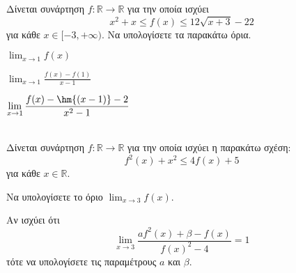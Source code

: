 \documentclass[twoside,nofonts,ektypwsh,math,spyros]{frontisthrio-diag}
\begin{document}
\begin{thema}
Δίνεται συνάρτηση $ f:\mathbb{R}\to\mathbb{R} $ για την οποία ισχύει
\[ x^2+x\leq f(x)\leq 12\sqrt{x+3}-22 \]
για κάθε $ x\in[-3,+\infty) $. Να υπολογίσετε τα παρακάτω όρια.
\begin{multicols}{3}
\begin{erwthma}
\item $ {\displaystyle{\lim_{x\to 1}{f(x)}}} $
\item $ {\displaystyle{\lim_{x\to 1}{\frac{f(x)-f(1)}{x-1}}}} $
\item $ {\displaystyle{\lim_{x\to 1}{\frac{f(x)-\hm{(x-1)}-2}{x^2-1}}}} $
\end{erwthma}
\end{multicols}
\item \mbox{}\\
Δίνεται συνάρτηση $ f:\mathbb{R}\to\mathbb{R} $ για την οποία ισχύει η παρακάτω σχέση:
\[ f^2(x)+x^2\leq 4f(x)+5 \]
για κάθε $ x\in\mathbb{R} $.
\begin{erwthma}
\item Να υπολογίσετε το όριο $ {\displaystyle{\lim_{x\to 3}{f(x)}}} $.
\item Αν ισχύει ότι 
\[ \lim_{x\to 3}{\frac{af^2(x)+\beta-f(x)}{f(x)^2-4}}=1 \]
τότε να υπολογίσετε τις παραμέτρους $ a $ και $ \beta $.
\end{erwthma}
\end{thema}
\kaliepityxia
\end{document}
